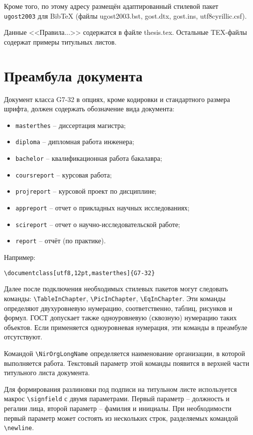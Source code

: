 \documentclass[utf8,14pt, coursreport]{G7-32}
\begin{document}
Кроме того, по этому адресу размещён адаптированный стилевой пакет \texttt{ugost2003} для Bib\TeX{} (файлы ugost2003.bst, gost.dtx, gost.ins, utf8cyrillic.csf).

Данные <<Правила...>> содержатся в файле thesis.tex. Остальные TEX-файлы содержат примеры титульных листов.

\section{Преамбула документа}

Документ класса G7-32 в опциях, кроме кодировки и стандартного размера шрифта, должен содержать обозначение вида документа:
\begin{itemize}
\item \texttt{masterthes} -- диссертация магистра;
\item \texttt{diploma} -- дипломная работа инженера;
\item \texttt{bachelor} -- квалификационная работа бакалавра;
\item \texttt{coursreport} -- курсовая работа;
\item \texttt{projreport} -- курсовой проект по дисциплине;
\item \texttt{appreport} -- отчет о прикладных научных исследованиях;
\item \texttt{scireport} -- отчет о научно-исследовательской работе;
\item \texttt{report} -- отчёт (по практике).
\end{itemize}

Например:
\begin{verbatim}
\documentclass[utf8,12pt,masterthes]{G7-32}
\end{verbatim}

Далее после подключения необходимых стилевых пакетов могут следовать команды:
\verb|\TableInChapter|, \verb|\PicInChapter|, \verb|\EqInChapter|. Эти команды определяют двухуровневую нумерацию, соответственно, таблиц, рисунков и формул. ГОСТ допускает также одноуровневую (сквозную) нумерацию таких объектов. Если применяется одноуровневая нумерация, эти команды в преамбуле отсутствуют.

Командой \verb|\NirOrgLongName| определяется наименование организации, в которой выполняется работа. Текстовый параметр этой команды появится в верхней части титульного листа документа.

Для формирования разлиновки под подписи на титульном листе используется макрос \verb|\signfield| с двумя параметрами. Первый параметр -- должность и регалии лица, второй параметр -- фамилия и инициалы. При необходимости первый параметр может состоять из нескольких строк, разделяемых командой \verb|\newline|.
\end{document}
